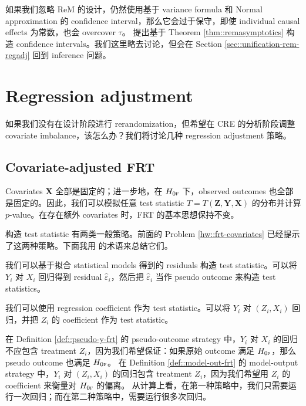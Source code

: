 如果我们忽略 ReM 的设计，仍然使用基于 \cite{Neyman:1923} variance formula 和 Normal approximation 的 confidence interval，那么它会过于保守，即使 individual causal effects 为常数，也会 overcover $\tau$。\citet{li2018asymptotic} 提出基于 Theorem \ref{thm::remasymptotics} 构造 confidence intervals。我们这里略去讨论，但会在 Section \ref{sec::unification-rem-regadj} 回到 inference 问题。

\section{Regression adjustment}

如果我们没有在设计阶段进行 rerandomization，但希望在 CRE 的分析阶段调整 covariate imbalance，该怎么办？我们将讨论几种 regression adjustment 策略。

\subsection{Covariate-adjusted FRT}\label{sec::covariate-adjusted-frt-intro}

Covariates $\boldsymbol{X}$ 全部是固定的；进一步地，在 $H_{0\textsc{f}}$ 下，observed outcomes 也全部是固定的。因此，我们可以模拟任意 test statistic $T = T(\boldsymbol{Z}, \boldsymbol{Y}, \boldsymbol{X})$ 的分布并计算 $p$-value。在存在额外 covariates 时，FRT 的基本思想保持不变。

构造 test statistic 有两类一般策略。前面的 Problem \ref{hw::frt-covariates} 已经提示了这两种策略。下面我用 \citet{zhao2020caFRT} 的术语来总结它们。

\begin{definition}
\label{def::pseudo-y-frt}
我们可以基于拟合 statistical models 得到的 residuals 构造 test statistic。可以将 $Y_i$ 对 $X_i$ 回归得到 residual $\hat \varepsilon_i$，然后把 $\hat \varepsilon_i$ 当作 pseudo outcome 来构造 test statistics。
\end{definition}

\begin{definition}
\label{def::model-out-frt}
我们可以使用 regression coefficient 作为 test statistic。可以将 $Y_i$ 对 $(Z_i, X_i)$ 回归，并把 $Z_i$ 的 coefficient 作为 test statistic。
\end{definition}

在 Definition \ref{def::pseudo-y-frt} 的 pseudo-outcome strategy 中，$Y_i$ 对 $X_i$ 的回归不应包含 treatment $Z_i$，因为我们希望保证：如果原始 outcome 满足 $H_{0\textsc{f}}$，那么 pseudo outcome 也满足 $H_{0\textsc{f}}$。
在 Definition \ref{def::model-out-frt} 的 model-output strategy 中，$Y_i$ 对 $(Z_i, X_i)$ 的回归包含 treatment $Z_i$，因为我们希望用 $Z_i$ 的 coefficient 来衡量对 $H_{0\textsc{f}}$ 的偏离。
从计算上看，在第一种策略中，我们只需要运行一次回归；而在第二种策略中，需要运行很多次回归。

